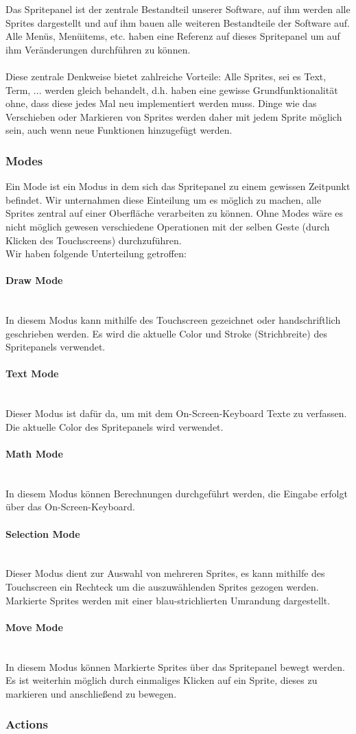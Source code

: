 Das Spritepanel ist der zentrale Bestandteil unserer Software, auf ihm werden alle Sprites dargestellt und auf ihm bauen alle weiteren Bestandteile der Software auf. Alle Menüs, Menüitems, etc. haben eine Referenz auf dieses Spritepanel um auf ihm Veränderungen durchführen zu können.\\
\\
Diese zentrale Denkweise bietet zahlreiche Vorteile: Alle Sprites, sei es Text, Term, ... werden gleich behandelt, d.h. haben eine gewisse Grundfunktionalität ohne, dass diese jedes Mal neu implementiert werden muss. Dinge wie das Verschieben oder Markieren von Sprites werden daher mit jedem Sprite möglich sein, auch wenn neue Funktionen hinzugefügt werden.

\subsubsection{Modes}

Ein Mode ist ein Modus in dem sich das Spritepanel zu einem gewissen Zeitpunkt befindet. Wir unternahmen diese Einteilung um es möglich zu machen, alle Sprites zentral auf einer Oberfläche verarbeiten zu können. Ohne Modes wäre es nicht möglich gewesen verschiedene Operationen mit der selben Geste (durch Klicken des Touchscreens) durchzuführen.\\
Wir haben folgende Unterteilung getroffen:

\setcounter{secnumdepth}{4}
\paragraph{Draw Mode}\ \\
In diesem Modus kann mithilfe des Touchscreen gezeichnet oder handschriftlich geschrieben werden. Es wird die aktuelle Color und Stroke (Strichbreite) des Spritepanels verwendet.
\paragraph{Text Mode}\ \\
Dieser Modus ist dafür da, um mit dem On-Screen-Keyboard Texte zu verfassen. Die aktuelle Color des Spritepanels wird verwendet. 
\paragraph{Math Mode}\ \\
In diesem Modus können Berechnungen durchgeführt werden, die Eingabe erfolgt über das On-Screen-Keyboard. 
\paragraph{Selection Mode}\ \\
Dieser Modus dient zur Auswahl von mehreren Sprites, es kann mithilfe des Touchscreen ein Rechteck um die auszuwählenden Sprites gezogen werden. Markierte Sprites werden mit einer blau-strichlierten Umrandung dargestellt.
\paragraph{Move Mode}\ \\
In diesem Modus können Markierte Sprites über das Spritepanel bewegt werden. Es ist weiterhin möglich durch einmaliges Klicken auf ein Sprite, dieses zu markieren und anschließend zu bewegen.

\subsubsection{Actions}